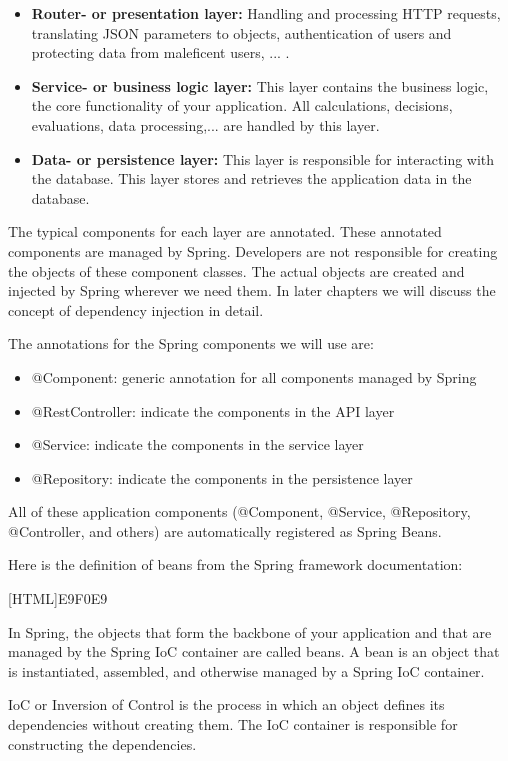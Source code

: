 \documentclass[a4paper, 12pt]{report}
\begin{document}
\begin{itemize}
\item \textbf{Router- or presentation layer:}  Handling and processing HTTP requests,  translating JSON parameters to objects,  authentication of users and protecting data from maleficent users,  ... .
\item \textbf{Service- or business logic layer:} This layer contains the business logic, the core functionality of your application. All calculations, decisions, evaluations, data processing,... are handled by this layer. 
\item \textbf{Data- or persistence layer:} This layer is responsible for interacting with the database.  This layer stores and retrieves the application data in the database.
\end{itemize}

The typical components for each layer are annotated.  These annotated components are managed by Spring. Developers are not responsible for creating the objects of these component classes. The actual objects are created and injected by Spring wherever we need them. In later chapters we will discuss the concept of dependency injection in detail.

The annotations for the Spring components we will use are:
\begin{itemize}
\item @Component: generic annotation for all components managed by Spring
\item @RestController: indicate the components in the API layer
\item @Service: indicate the components in the service layer
\item @Repository: indicate the components in the persistence layer
\end{itemize}

All of these application components (@Component, @Service, @Repository, @Controller, and others) are automatically registered as Spring Beans.

Here is the definition of beans from the Spring framework documentation:

[HTML]{E9F0E9}{\parbox{\textwidth}{%
\noindent In Spring, the objects that form the backbone of your application and that are managed by the Spring IoC container are called beans. A bean is an object that is instantiated, assembled, and otherwise managed by a Spring IoC container.}}

IoC or Inversion of Control is the process in which an object defines its dependencies without creating them. The IoC container is responsible for constructing the dependencies.
\end{document}
